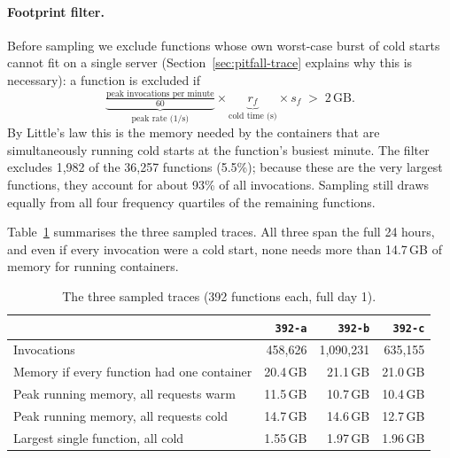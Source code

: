 \documentclass[11pt,a4paper]{article}
\newcommand{\code}[1]{\texttt{#1}}
\begin{document}
\paragraph{Footprint filter.} Before sampling we exclude functions whose own worst-case
burst of cold starts cannot fit on a single server (Section~\ref{sec:pitfall-trace}
explains why this is necessary): a function is excluded if
\begin{equation}
  \label{eq:filter}
  \underbrace{\tfrac{\text{peak invocations per minute}}{60}}_{\text{peak rate (1/s)}}
  \times \underbrace{r_f}_{\text{cold time (s)}} \times s_f \;>\; 2\,\text{GB}.
\end{equation}
By Little's law this is the memory needed by the containers that are simultaneously running
cold starts at the function's busiest minute. The filter excludes 1,982 of the 36,257
functions (5.5\%); because these are the very largest functions, they account for about 93\%
of all invocations. Sampling still draws equally from all four frequency quartiles of the
remaining functions.

Table~\ref{tab:traces} summarises the three sampled traces. All three span the full 24 hours,
and even if every invocation were a cold start, none needs more than 14.7\,GB of memory for
running containers.

\begin{table}[htbp]
\centering
\caption{The three sampled traces (392 functions each, full day 1).}
\label{tab:traces}
\begin{tabular}{@{}lrrr@{}}
\toprule
 & \code{392-a} & \code{392-b} & \code{392-c} \\
\midrule
Invocations                                         & 458,626 & 1,090,231 & 635,155 \\
Memory if every function had one container          & 20.4\,GB & 21.1\,GB & 21.0\,GB \\
Peak running memory, all requests warm              & 11.5\,GB & 10.7\,GB & 10.4\,GB \\
Peak running memory, all requests cold              & 14.7\,GB & 14.6\,GB & 12.7\,GB \\
Largest single function, all cold                    & 1.55\,GB & 1.97\,GB & 1.96\,GB \\
\bottomrule
\end{tabular}
\end{table}
\end{document}
